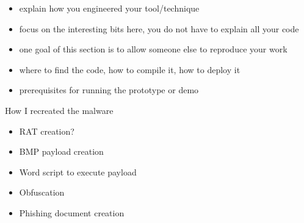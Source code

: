 

\begin{itemize}
  \item explain how you engineered your tool/technique
  \item focus on the interesting bits here, you do not have to explain all your code
  \item one goal of this section is to allow someone else to reproduce your work
  \item where to find the code, how to compile it, how to deploy it
  \item prerequisites for running the prototype or demo
\end{itemize}
How I recreated the malware
\begin{itemize}
  \item RAT creation?
  \item BMP payload creation
  \item Word script to execute payload
  \item Obfuscation
  \item Phishing document creation
\end{itemize}

